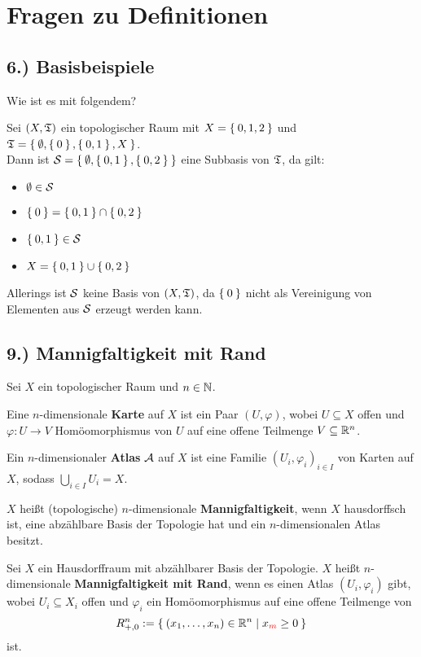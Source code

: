 \documentclass[a5paper,oneside]{scrbook}
\begin{document}
\chapter{Fragen zu Definitionen}
\section*{6.) Basisbeispiele}

Wie ist es mit folgendem?

Sei $(X, \mathfrak{T})$ ein topologischer Raum mit 
  $X = \Set{0,1,2}$ und $\mathfrak{T} = \Set{\emptyset, \Set{0}, \Set{0,1}, X}$.\\
  Dann ist $\mathcal{S} = \Set{\emptyset, \Set{0,1}, \Set{0,2}}$ eine Subbasis von 
  $\mathfrak{T}$, da gilt:
  \begin{itemize}
    \item $\emptyset \in \mathcal{S}$
    \item $\Set{0} = \Set{0, 1} \cap \Set{0,2}$
    \item $\Set{0,1} \in \mathcal{S}$
    \item $X = \Set{0,1} \cup \Set{0,2}$
  \end{itemize}
  Allerings ist $\mathcal{S}$ keine Basis von $(X, \mathfrak{T})$, da
  $\Set{0}$ nicht als Vereinigung von Elementen aus $\mathcal{S}$
  erzeugt werden kann.


\section*{9.) Mannigfaltigkeit mit Rand}
\begin{definition}%
    Sei $X$ ein topologischer Raum und $n \in \mathbb{N}$.
    \begin{defenum}
        \item Eine $n$-dimensionale \textbf{Karte} auf
              $X$ ist ein Paar $(U, \varphi)$, wobei $U \subseteq X$
              offen und $\varphi: U \rightarrow V$ Homöomorphismus
              von $U$ auf eine offene Teilmenge $V \subseteq \mathbb{R}^n$.
        \item Ein $n$-dimensionaler \textbf{Atlas} $\mathcal{A}$ auf $X$ ist eine
              Familie $(U_i, \varphi_i)_{i \in I}$ von Karten auf $X$,
              sodass $\bigcup_{i \in I} U_i = X$.
        \item $X$ heißt (topologische) $n$-dimensionale \textbf{Mannigfaltigkeit},
              wenn $X$ hausdorffsch ist, eine abzählbare Basis der 
              Topologie hat und ein $n$-dimensionalen Atlas besitzt.
    \end{defenum}
\end{definition}
\begin{definition}%
    Sei $X$ ein Hausdorffraum mit abzählbarer Basis der Topologie.
    $X$ heißt $n$-dimensionale \textbf{Mannigfaltigkeit mit Rand},
    wenn es einen Atlas $(U_i, \varphi_i)$ gibt, wobei $U_i \subseteq X_i$
    offen und $\varphi_i$ ein Homöomorphismus auf eine offene 
    Teilmenge von 
    \[R_{+,0}^n := \Set{(x_1, \dots, x_n) \in \ensuremath{\mathbb{R}}^n | x_{\color{red}m} \geq 0}\]
    ist.
\end{definition}
\end{document}
